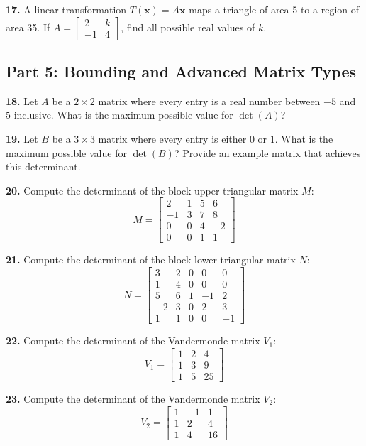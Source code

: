 \documentclass[11pt]{article}
\begin{document}
\textbf{17.} A linear transformation $T(\mathbf{x}) = A\mathbf{x}$ maps a triangle of area 5 to a region of area 35. If $A = \begin{bmatrix} 2 & k \\ -1 & 4 \end{bmatrix}$, find all possible real values of $k$.

\subsection*{Part 5: Bounding and Advanced Matrix Types}

\textbf{18.} Let $A$ be a $2 \times 2$ matrix where every entry is a real number between $-5$ and $5$ inclusive. What is the maximum possible value for $\det(A)$?

\textbf{19.} Let $B$ be a $3 \times 3$ matrix where every entry is either $0$ or $1$. What is the maximum possible value for $\det(B)$? Provide an example matrix that achieves this determinant.

\textbf{20.} Compute the determinant of the block upper-triangular matrix $M$:
$$M = \begin{bmatrix} 2 & 1 & 5 & 6 \\ -1 & 3 & 7 & 8 \\ 0 & 0 & 4 & -2 \\ 0 & 0 & 1 & 1 \end{bmatrix}$$

\textbf{21.} Compute the determinant of the block lower-triangular matrix $N$:
$$N = \begin{bmatrix} 3 & 2 & 0 & 0 & 0 \\ 1 & 4 & 0 & 0 & 0 \\ 5 & 6 & 1 & -1 & 2 \\ -2 & 3 & 0 & 2 & 3 \\ 1 & 1 & 0 & 0 & -1 \end{bmatrix}$$

\textbf{22.} Compute the determinant of the Vandermonde matrix $V_1$:
$$V_1 = \begin{bmatrix} 1 & 2 & 4 \\ 1 & 3 & 9 \\ 1 & 5 & 25 \end{bmatrix}$$

\textbf{23.} Compute the determinant of the Vandermonde matrix $V_2$:
$$V_2 = \begin{bmatrix} 1 & -1 & 1 \\ 1 & 2 & 4 \\ 1 & 4 & 16 \end{bmatrix}$$
\end{document}
